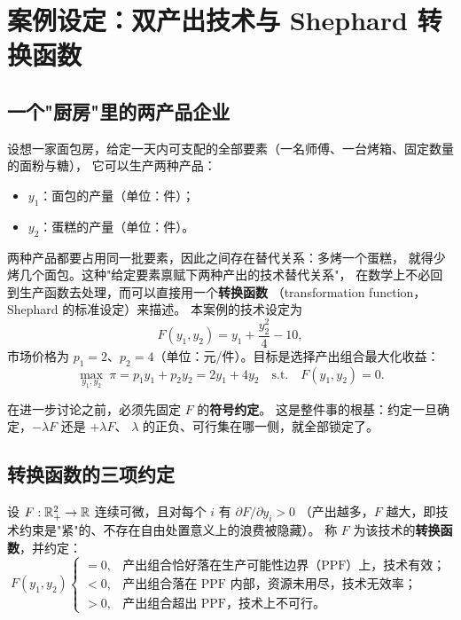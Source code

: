 
\section{案例设定：双产出技术与 Shephard 转换函数}
\label{sec:convention}

\subsection{一个"厨房"里的两产品企业}

设想一家面包房，给定一天内可支配的全部要素（一名师傅、一台烤箱、固定数量的面粉与糖），
它可以生产两种产品：

\begin{itemize}
  \item $y_1$：面包的产量（单位：件）；
  \item $y_2$：蛋糕的产量（单位：件）。
\end{itemize}

两种产品都要占用同一批要素，因此之间存在替代关系：多烤一个蛋糕，
就得少烤几个面包。这种"给定要素禀赋下两种产出的技术替代关系"，
在数学上不必回到生产函数去处理，而可以直接用一个\textbf{转换函数}
（transformation function，Shephard 的标准设定）来描述。
本案例的技术设定为
\begin{equation}
F(y_1,y_2)=y_1+\frac{y_2^{2}}{4}-10,
\label{eq:tech}
\end{equation}
市场价格为 $p_1=2$、$p_2=4$（单位：元/件）。目标是选择产出组合最大化收益：
\begin{equation}
\max_{y_1,y_2}\ \pi=p_1y_1+p_2y_2=2y_1+4y_2
\quad\text{s.t.}\quad F(y_1,y_2)=0.
\label{eq:rm}
\end{equation}

在进一步讨论之前，必须先固定 $F$ 的\textbf{符号约定}。
这是整件事的根基：约定一旦确定，$- \lambda F$ 还是 $+\lambda F$、
$\lambda$ 的正负、可行集在哪一侧，就全部锁定了。

\subsection{转换函数的三项约定}

\begin{definition}[转换函数及其约定]
设 $F:\mathbb{R}^{2}_{+}\to\mathbb{R}$ 连续可微，且对每个 $i$ 有 $\partial F/\partial y_i>0$
（产出越多，$F$ 越大，即技术约束是"紧"的、不存在自由处置意义上的浪费被隐藏）。
称 $F$ 为该技术的\textbf{转换函数}，并约定：
\begin{equation}
F(y_1,y_2)
\begin{cases}
=0, & \text{产出组合恰好落在生产可能性边界（PPF）上，技术有效；}\\[2pt]
<0, & \text{产出组合落在 PPF 内部，资源未用尽，技术无效率；}\\[2pt]
>0, & \text{产出组合超出 PPF，技术上不可行。}
\end{cases}
\label{eq:convention}
\end{equation}
\end{definition}

